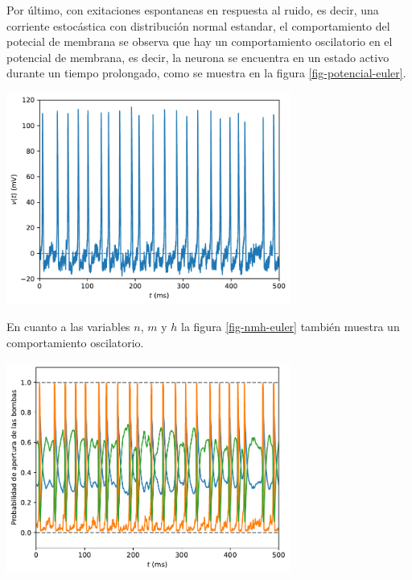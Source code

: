 \documentclass[aps,prl,reprint,groupedaddress]{revtex4-2}
\newenvironment{Figura}
  {\par\medskip\noindent\minipage{\linewidth}}
  {\endminipage\par\medskip}
\begin{document}
Por último, con exitaciones espontaneas en respuesta al ruido, es decir, una 
corriente estocástica con distribución normal estandar, el comportamiento del 
potecial de membrana se observa que hay un comportamiento oscilatorio en el
potencial de membrana, es decir, la neurona se encuentra en un estado activo
durante un tiempo prolongado, como se muestra en la figura \ref{fig-potencial-euler}.

\begin{Figura}
    \centering
    \includegraphics[width=0.7\textwidth]{figs/potencial_euler.pdf}
    \label{fig-potencial-euler}
\end{Figura}

En cuanto a las variables $n$, $m$ y $h$ la figura \ref{fig-nmh-euler} también 
muestra un comportamiento oscilatorio.
\begin{Figura}
    \centering
    \includegraphics[width=0.7\textwidth]{figs/nmh_euler.pdf}
    \label{fig-nmh-euler}
\end{Figura}
\end{document}
